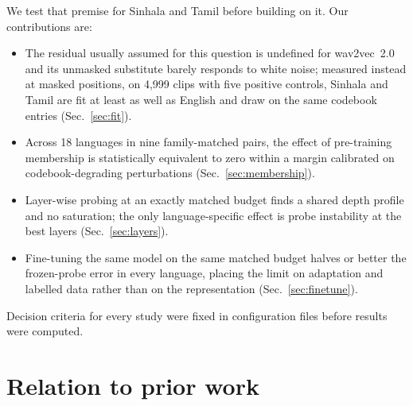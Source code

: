 \documentclass{article}
\begin{document}
We test that premise for Sinhala and Tamil before building on it. Our contributions are:
\begin{itemize}
\item The residual usually assumed for this question is undefined for wav2vec~2.0 and its unmasked substitute barely responds to white noise; measured instead at masked positions, on 4,999 clips with five positive controls, Sinhala and Tamil are fit at least as well as English and draw on the same codebook entries (Sec.~\ref{sec:fit}).
\item Across 18 languages in nine family-matched pairs, the effect of pre-training membership is statistically equivalent to zero within a margin calibrated on codebook-degrading perturbations (Sec.~\ref{sec:membership}).
\item Layer-wise probing at an exactly matched budget finds a shared depth profile and no saturation; the only language-specific effect is probe instability at the best layers (Sec.~\ref{sec:layers}).
\item Fine-tuning the same model on the same matched budget halves or better the frozen-probe error in every language, placing the limit on adaptation and labelled data rather than on the representation (Sec.~\ref{sec:finetune}).
\end{itemize}
Decision criteria for every study were fixed in configuration files before results were computed.

\section{Relation to prior work}
\label{sec:prior}
\end{document}
